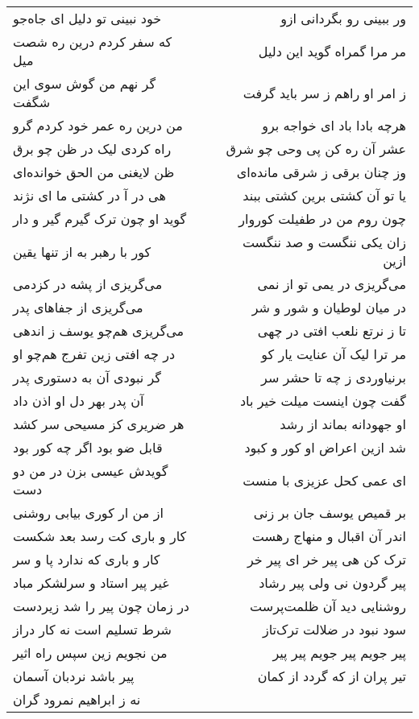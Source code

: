 \begin{center}
\begin{longtable}{l p{0.5cm} r}
خود نبینی تو دلیل ای جاه‌جو
&&
ور ببینی رو بگردانی ازو
\\
که سفر کردم درین ره شصت میل
&&
مر مرا گمراه گوید این دلیل
\\
گر نهم من گوش سوی این شگفت
&&
ز امر او راهم ز سر باید گرفت
\\
من درین ره عمر خود کردم گرو
&&
هرچه بادا باد ای خواجه برو
\\
راه کردی لیک در ظن چو برق
&&
عشر آن ره کن پی وحی چو شرق
\\
ظن لایغنی من الحق خوانده‌ای
&&
وز چنان برقی ز شرقی مانده‌ای
\\
هی در آ در کشتی ما ای نژند
&&
یا تو آن کشتی برین کشتی ببند
\\
گوید او چون ترک گیرم گیر و دار
&&
چون روم من در طفیلت کوروار
\\
کور با رهبر به از تنها یقین
&&
زان یکی ننگست و صد ننگست ازین
\\
می‌گریزی از پشه در کزدمی
&&
می‌گریزی در یمی تو از نمی
\\
می‌گریزی از جفاهای پدر
&&
در میان لوطیان و شور و شر
\\
می‌گریزی هم‌چو یوسف ز اندهی
&&
تا ز نرتع نلعب افتی در چهی
\\
در چه افتی زین تفرج هم‌چو او
&&
مر ترا لیک آن عنایت یار کو
\\
گر نبودی آن به دستوری پدر
&&
برنیاوردی ز چه تا حشر سر
\\
آن پدر بهر دل او اذن داد
&&
گفت چون اینست میلت خیر باد
\\
هر ضریری کز مسیحی سر کشد
&&
او جهودانه بماند از رشد
\\
قابل ضو بود اگر چه کور بود
&&
شد ازین اعراض او کور و کبود
\\
گویدش عیسی بزن در من دو دست
&&
ای عمی کحل عزیزی با منست
\\
از من ار کوری بیابی روشنی
&&
بر قمیص یوسف جان بر زنی
\\
کار و باری کت رسد بعد شکست
&&
اندر آن اقبال و منهاج رهست
\\
کار و باری که ندارد پا و سر
&&
ترک کن هی پیر خر ای پیر خر
\\
غیر پیر استاد و سرلشکر مباد
&&
پیر گردون نی ولی پیر رشاد
\\
در زمان چون پیر را شد زیردست
&&
روشنایی دید آن ظلمت‌پرست
\\
شرط تسلیم است نه کار دراز
&&
سود نبود در ضلالت ترک‌تاز
\\
من نجویم زین سپس راه اثیر
&&
پیر جویم پیر جویم پیر پیر
\\
پیر باشد نردبان آسمان
&&
تیر پران از که گردد از کمان
\\
نه ز ابراهیم نمرود گران

\end{longtable}
\end{center}
